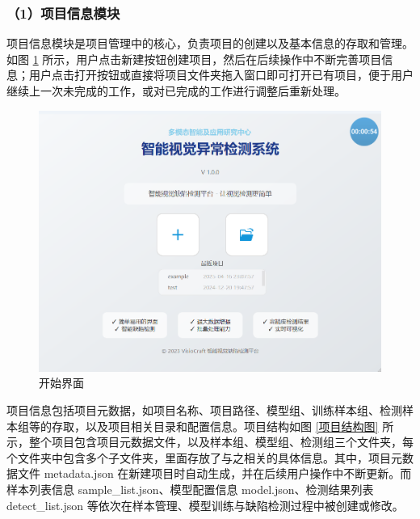 \documentclass[
  ]{njuthesis}
\begin{document}
\subsubsection{（1）项目信息模块}

项目信息模块是项目管理中的核心，负责项目的创建以及基本信息的存取和管理。如图 \ref{开始界面} 所示，用户点击新建按钮创建项目，然后在后续操作中不断完善项目信息；用户点击打开按钮或直接将项目文件夹拖入窗口即可打开已有项目，便于用户继续上一次未完成的工作，或对已完成的工作进行调整后重新处理。

\begin{figure}[htb]
    \centering
    \includegraphics[width=\textwidth]{images/开始界面.png}
    \caption{开始界面}
    \label{开始界面}
\end{figure}

项目信息包括项目元数据，如项目名称、项目路径、模型组、训练样本组、检测样本组等的存取，以及项目相关目录和配置信息。项目结构如图 \ref{项目结构图} 所示，整个项目包含项目元数据文件，以及样本组、模型组、检测组三个文件夹，每个文件夹中包含多个子文件夹，里面存放了与之相关的具体信息。其中，项目元数据文件 metadata.json 在新建项目时自动生成，并在后续用户操作中不断更新。而样本列表信息 sample\_list.json、模型配置信息 model.json、检测结果列表 detect\_list.json 等依次在样本管理、模型训练与缺陷检测过程中被创建或修改。
\end{document}
